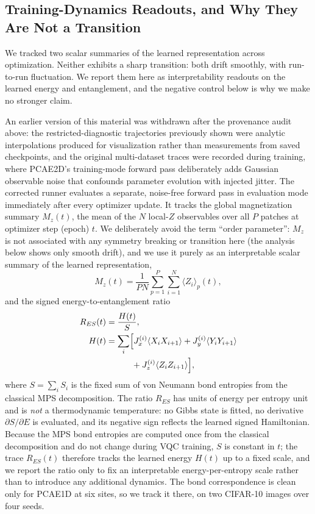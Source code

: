\documentclass[11pt]{article}
\begin{document}
\subsection{Training-Dynamics Readouts, and Why They Are Not a Transition}
\label{sec:phase_transition}
We tracked two scalar summaries of the learned representation across optimization. Neither exhibits a sharp transition: both drift smoothly, with run-to-run fluctuation. We report them here as interpretability readouts on the learned energy and entanglement, and the negative control below is why we make no stronger claim.

An earlier version of this material was withdrawn after the provenance audit above: the restricted-diagnostic trajectories previously shown were analytic interpolations produced for visualization rather than measurements from saved checkpoints, and the original multi-dataset traces were recorded during training, where PCAE2D's training-mode forward pass deliberately adds Gaussian observable noise that confounds parameter evolution with injected jitter. The corrected runner evaluates a separate, noise-free forward pass in evaluation mode immediately after every optimizer update. It tracks the global magnetization summary $M_z(t)$, the mean of the $N$ local-$Z$ observables over all $P$ patches at optimizer step (epoch) $t$. We deliberately avoid the term ``order parameter'': $M_z$ is not associated with any symmetry breaking or transition here (the analysis below shows only smooth drift), and we use it purely as an interpretable scalar summary of the learned representation,
\begin{equation}
M_z(t) = \frac{1}{P N}\sum_{p=1}^{P}\sum_{i=1}^{N}\langle Z_i\rangle_p(t),
\label{eq:order_parameter}
\end{equation}
and the signed energy-to-entanglement ratio
\begin{align}
R_{ES}(t)&=\frac{H(t)}{S},\\
H(t)&=\sum_i\Bigl[J_x^{(i)}\langle X_iX_{i+1}\rangle
+J_y^{(i)}\langle Y_iY_{i+1}\rangle \nonumber\\
&\hspace{3.0em}+J_z^{(i)}\langle Z_iZ_{i+1}\rangle\Bigr],
\end{align}
where $S=\sum_i S_i$ is the fixed sum of von Neumann bond entropies from the classical MPS decomposition. The ratio $R_{ES}$ has units of energy per entropy unit and is \emph{not} a thermodynamic temperature: no Gibbs state is fitted, no derivative $\partial S/\partial E$ is evaluated, and its negative sign reflects the learned signed Hamiltonian. Because the MPS bond entropies are computed once from the classical decomposition and do not change during VQC training, $S$ is constant in $t$; the trace $R_{ES}(t)$ therefore tracks the learned energy $H(t)$ up to a fixed scale, and we report the ratio only to fix an interpretable energy-per-entropy scale rather than to introduce any additional dynamics. The bond correspondence is clean only for PCAE1D at six sites, so we track it there, on two CIFAR-10 images over four seeds.
\end{document}
